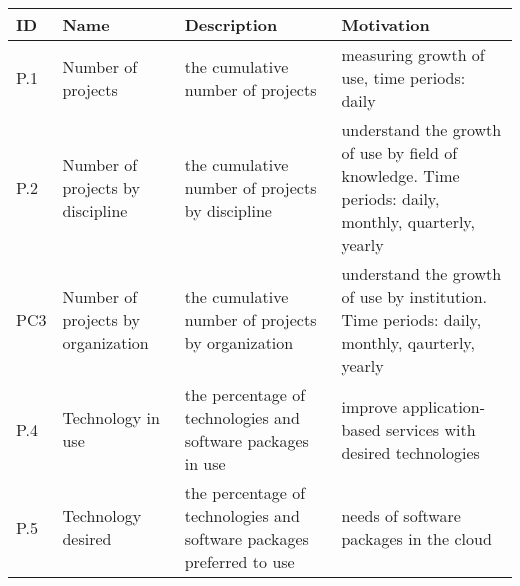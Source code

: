 \newcommand{\eTABLE}{\end{tabular}
\end{center}
\end{scriptsize}
\end{table*}}

\newcommand{\bTABLE}[2]{
\begin{table*}[P]
\caption{#1}
\label{#2}
\bigskip
\begin{scriptsize}
\begin{center}
\begin{tabular}{lp{0.15\textwidth}p{0.3\textwidth}p{0.4\textwidth}}
\hline
\rowcolor{blue!20} \bf ID & \bf Name & \bf Description & \bf Motivation \\
\hline}

\newenvironment{METRICTABLE}[2] {\bTABLE{#1}{#2}}{\eTABLE}


\begin{METRICTABLE}{Project  management related metrics.}{T:project}
P.1 & Number of projects &  the cumulative number of projects &   measuring growth of use, time periods:  daily \\ \hline
P.2 & Number of projects by discipline &  the cumulative number of projects by discipline & understand the growth of use by field of knowledge. Time periods: daily, monthly, quarterly, yearly \\ \hline
PC3 & Number of projects by organization &  the cumulative number of projects by organization & understand the growth of use by institution. Time periods: daily, monthly, qaurterly, yearly \\ \hline
P.4 & Technology in use   &  the percentage of technologies and software packages in use &  improve application-based services with desired technologies \\ \hline
P.5 & Technology desired &  the percentage of technologies and software packages preferred to use & needs of software packages in the cloud \\ \hline
\end{METRICTABLE}

